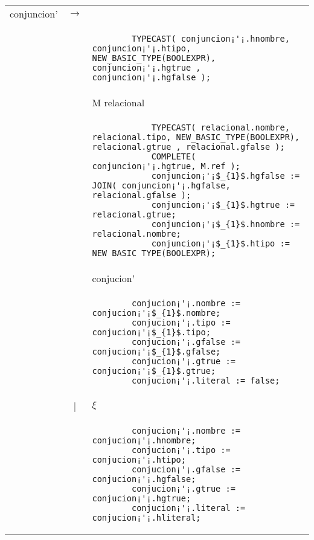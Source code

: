 \small
\begin{tabular}{r c p{}}

		
			conjuncion'			& $\longrightarrow$ 	& \ter{and} \\
								&					& \begin{lstlisting}
		TYPECAST( conjuncion¡'¡.hnombre, conjuncion¡'¡.htipo, NEW_BASIC_TYPE(BOOLEXPR), conjuncion¡'¡.hgtrue , conjuncion¡'¡.hgfalse );
                    									\end{lstlisting} \\
								&					& M relacional \\
								&					& \begin{lstlisting}
            TYPECAST( relacional.nombre, relacional.tipo, NEW_BASIC_TYPE(BOOLEXPR), relacional.gtrue , relacional.gfalse );
            COMPLETE( conjuncion¡'¡.hgtrue, M.ref );
            conjuncion¡'¡$_{1}$.hgfalse := JOIN( conjuncion¡'¡.hgfalse, relacional.gfalse );
            conjuncion¡'¡$_{1}$.hgtrue := relacional.gtrue;
            conjuncion¡'¡$_{1}$.hnombre := relacional.nombre;
            conjuncion¡'¡$_{1}$.htipo := NEW_BASIC_TYPE(BOOLEXPR);
                    									\end{lstlisting} \\
								&					& conjucion' \\
								&					& \begin{lstlisting}
        conjucion¡'¡.nombre := conjucion¡'¡$_{1}$.nombre;
        conjucion¡'¡.tipo := conjucion¡'¡$_{1}$.tipo;
        conjucion¡'¡.gfalse := conjucion¡'¡$_{1}$.gfalse;
        conjucion¡'¡.gtrue := conjucion¡'¡$_{1}$.gtrue;
        conjucion¡'¡.literal := false;
                    									\end{lstlisting} \\
									
								& | 					& $\xi$ \\
								&					& \begin{lstlisting}
        conjucion¡'¡.nombre := conjucion¡'¡.hnombre;
        conjucion¡'¡.tipo := conjucion¡'¡.htipo;
        conjucion¡'¡.gfalse := conjucion¡'¡.hgfalse;
        conjucion¡'¡.gtrue := conjucion¡'¡.hgtrue;
        conjucion¡'¡.literal := conjucion¡'¡.hliteral;
                    									\end{lstlisting} \\

\end{tabular}


